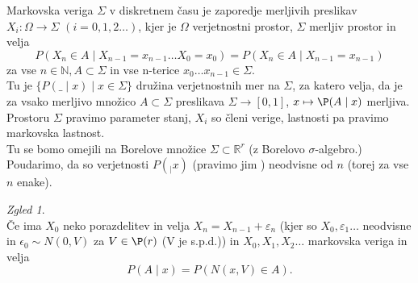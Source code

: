 \documentclass[a4paper, 12pt]{book}
\theoremstyle{definition}
\theoremstyle{remark}
\newtheorem*{exmp}{Zgled}
\newcommand{\N}{\mathbb{N}}
\newcommand{\R}{\mathbb{R}}
\begin{document}
Markovska veriga  $\Sigma$ v diskretnem času je zaporedje merljivih preslikav $X_i: \Omega \to \Sigma$
$(i = 0, 1, 2 \dots)$, kjer je $\Omega$ verjetnostni prostor, $\Sigma$ merljiv prostor in velja
\begin{equation}
  P(X_n \in A \mid X_{n-1} = x_{n-1} \dots X_0 = x_0) = P(X_n \in A \mid X_{n-1} = x_{n-1})
  \label{markovska-lastnost-A}
\end{equation}
za vse $n \in \N, A \subset \Sigma$ in vse n-terice $x_0 \dots x_{n-1} \in \Sigma$. \\
Tu je $\{P(\_ \mid x) \mid x \in \Sigma\}$ družina verjetnostnih mer na $\Sigma$, za katero velja,
da je za vsako merljivo množico $A \subset \Sigma$ preslikava $\Sigma \to [0,1]$, $x \mapsto \P(A \mid x)$ merljiva. \\
Prostoru $\Sigma$ pravimo parameter stanj, $X_i$ so členi verige,
lastnosti  pa pravimo markovska lastnost. \\
Tu se bomo omejili na Borelove množice $\Sigma \subset \R^r$ (z Borelovo $\sigma$-algebro.) \\
Poudarimo, da so verjetnosti $P(_ \mid x)$ (pravimo jim ) neodvisne od $n$
(torej za vse $n$ enake).
\begin{exmp} \text{} \\
  Če ima $X_0$ neko porazdelitev in velja $X_n = X_{n-1} + \varepsilon_n$
  (kjer so $X_0, \varepsilon_1 \dots$ neodvisne in $\epsilon_0 \sim N(0, V)$ za $V \in \P(r)$ (V je s.p.d.))
  in $X_0, X_1, X_2 \dots$ markovska veriga in velja
  \begin{equation*}
    P(A \mid x) = P(N(x, V) \in A).
  \end{equation*}
\end{exmp}
\end{document}
